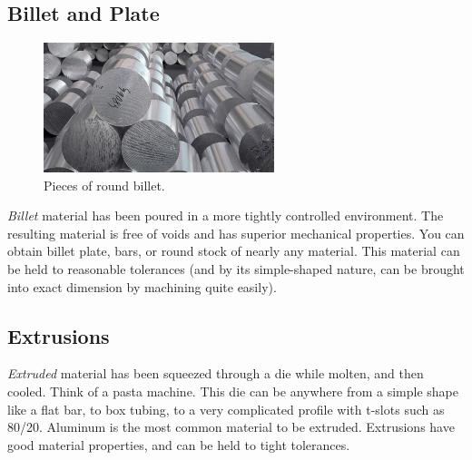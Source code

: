  \subsection{Billet and Plate}
 
 \begin{figure}[H]
	\includegraphics[width=0.6\textwidth]{imgs/billet.jpeg}
	\caption{Pieces of round billet.}
\end{figure} 
 \textit{Billet} material has been poured in a more tightly controlled environment. The resulting material is free of voids and has superior mechanical properties. You can obtain billet plate, bars, or round stock of nearly any material. This material can be held to reasonable tolerances (and by its simple-shaped nature, can be brought into exact dimension by machining quite easily).
 
 \subsection{Extrusions} \label{subsec:extrusions}
 \textit{Extruded} material has been squeezed through a die while molten, and then cooled. Think of a pasta machine. This die can be anywhere from a simple shape like a flat bar, to box tubing, to a very complicated profile with t-slots such as 80/20. Aluminum is the most common material to be extruded. Extrusions have good material properties, and can be held to tight tolerances.
 

